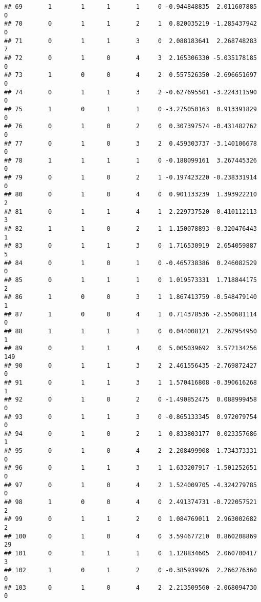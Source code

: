 \documentclass[]{article}
\begin{document}
\begin{verbatim}
## 69       1        1      1       1     0 -0.944848835  2.011607885     0
## 70       0        1      1       2     1  0.820035219 -1.285437942     0
## 71       0        1      1       3     0  2.088183641  2.268748283     7
## 72       0        1      0       4     3  2.165306330 -5.035178185     0
## 73       1        0      0       4     2  0.557526350 -2.696651697     0
## 74       0        1      1       3     2 -0.627695501 -3.224311590     0
## 75       1        0      1       1     0 -3.275050163  0.913391829     0
## 76       0        1      0       2     0  0.307397574 -0.431482762     0
## 77       0        1      0       3     2  0.459303737 -3.140106678     0
## 78       1        1      1       1     0 -0.188099161  3.267445326     0
## 79       0        1      0       2     1 -0.197423220 -0.238331914     0
## 80       0        1      0       4     0  0.901133239  1.393922210     2
## 81       0        1      1       4     1  2.229737520 -0.410112113     3
## 82       1        1      0       2     1  1.150078893 -0.320476443     1
## 83       0        1      1       3     0  1.716530919  2.654059887     5
## 84       0        1      0       1     0 -0.465738386  0.246082529     0
## 85       0        1      1       1     0  1.019573331  1.718844175     2
## 86       1        0      0       3     1  1.867413759 -0.548479140     1
## 87       1        0      0       4     1  0.714378536 -2.550681114     0
## 88       1        1      1       1     0  0.044008121  2.262954950     1
## 89       0        1      1       4     0  5.005039692  3.572134256   149
## 90       0        1      1       3     2  2.461556435 -2.769872427     0
## 91       0        1      1       3     1  1.570416808 -0.390616268     1
## 92       0        1      0       2     0 -1.490852475  0.088999458     0
## 93       0        1      1       3     0 -0.865133345  0.972079754     0
## 94       0        1      0       2     1  0.833803177  0.023357686     1
## 95       0        1      0       4     2  2.208499908 -1.734373331     0
## 96       0        1      1       3     1  1.633207917 -1.501252651     0
## 97       0        1      0       4     2  1.524009705 -4.324279785     0
## 98       1        0      0       4     0  2.491374731 -0.722057521     2
## 99       0        1      1       2     0  1.084769011  2.963002682     2
## 100      0        1      0       4     0  3.594677210  0.860208869    29
## 101      0        1      1       1     0  1.128834605  2.060700417     3
## 102      1        0      1       2     0 -0.385939926  2.266276360     0
## 103      0        1      0       4     2  2.213509560 -2.068094730     0

\end{verbatim}
\end{document}
